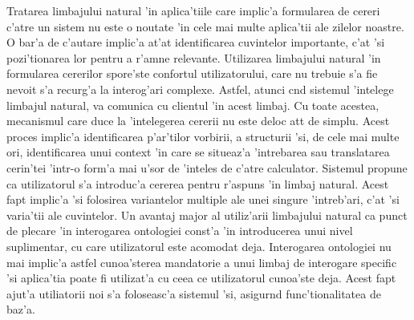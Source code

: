 \documentclass[12pt,a4paper,twoside]{report}
\begin{document}
Tratarea limbajului natural 'in aplica'tiile care implic'a formularea de cereri c'atre un sistem nu este o noutate 'in cele mai multe aplica'tii ale zilelor noastre. O bar'a de c'autare implic'a at'at identificarea cuvintelor importante, c'at 'si pozi'tionarea lor pentru a r'am\ia ne relevante. Utilizarea limbajului natural 'in formularea cererilor spore'ste confortul utilizatorului, care nu trebuie s'a fie nevoit s'a recurg'a la interog'ari complexe. Astfel, atunci c\ia nd sistemul 'intelege limbajul natural, va comunica cu clientul 'in acest limbaj. Cu toate acestea, mecanismul care duce la 'intelegerea cererii nu este deloc at\ia t de simplu. Acest proces implic'a identificarea p'ar'tilor vorbirii, a structurii 'si, de cele mai multe ori, identificarea unui context 'in care se situeaz'a 'intrebarea sau translatarea cerin'tei 'intr-o form'a mai u'sor de 'inteles de c'atre calculator.
Sistemul propune ca utilizatorul s'a introduc'a cererea pentru r'aspuns 'in limbaj natural. Acest fapt implic'a 'si folosirea variantelor multiple ale unei singure 'intreb'ari, c'at 'si varia'tii ale cuvintelor. Un avantaj major al utiliz'arii limbajului natural ca punct de plecare 'in interogarea ontologiei const'a 'in introducerea unui nivel suplimentar, cu care utilizatorul este acomodat deja. Interogarea ontologiei nu mai implic'a astfel cunoa'sterea mandatorie a unui limbaj de interogare specific 'si aplica'tia poate fi utilizat'a cu ceea ce utilizatorul cunoa'ste deja. Acest fapt ajut'a utiliatorii noi s'a foloseasc'a sistemul 'si, asigur\ia nd func'tionalitatea de baz'a.
\end{document}
